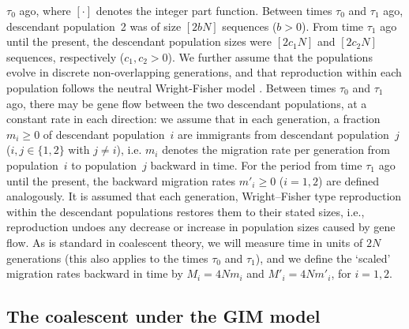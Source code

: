 \documentclass[11pt]{article}
\begin{document}
$\tau_0$ ago, where $[\cdot]$ denotes the integer part function. Between times $\tau_0$ and $\tau_1$ ago, descendant population~2 was of size $[2bN]$ sequences ($b>0$). From time $\tau_1$ ago until the present, the descendant population sizes were $[2c_1N]$ and $[2c_2N]$ sequences, respectively ($c_1, c_2 > 0$). 
We further assume that the populations evolve in discrete non-overlapping generations, and that reproduction within each population follows the neutral Wright-Fisher model \citep{Fisher1930,Wright1931}.
Between times $\tau_0$ and $\tau_1$ ago, there may be gene flow 
between the two descendant populations, at a constant rate in each direction: we assume that in each generation, a fraction $m_i \geq 0$ of descendant population~$i$ are immigrants from descendant population~$j$ ($i, j \in \{1,2\}$ with $j \neq i$), i.e. $m_i$ denotes the migration rate per generation from population~$i$ to population~$j$ backward in time. 
For the period from time $\tau_1$ ago until the present, the backward migration rates $m'_i \geq 0$ ($i=1,2$) are defined analogously. 
It is assumed that each generation, Wright–Fisher type reproduction within the descendant populations restores them to their stated
sizes, i.e., reproduction undoes any decrease or increase in population sizes caused by gene flow.
As is standard in coalescent theory, we will measure time in units of $2N$ generations 
(this also applies to the times $\tau_0$ and $\tau_1$), and we define the `scaled' migration
rates backward in time by $M_i=4Nm_i$ and $M'_i=4Nm'_i$, for $i=1,2$.

\subsection{The coalescent under the GIM model}
\end{document}
